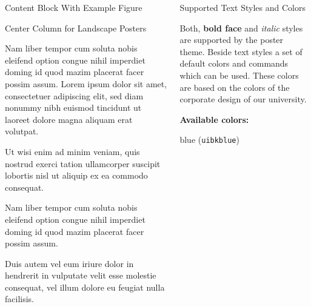 \documentclass[final]{beamer}
\begin{document}
\begin{frame}[fragile]
\begin{columns}[t]
\begin{centercolumn}
\begin{boxblock}{Content Block With Example Figure}
      \end{boxblock}

      \begin{boxblock}{Center Column for Landscape Posters}

         Nam liber tempor cum soluta nobis eleifend option congue nihil imperdiet doming
         id quod mazim placerat facer possim assum. Lorem ipsum dolor sit amet,
         consectetuer adipiscing elit, sed diam nonummy nibh euismod tincidunt ut
         laoreet dolore magna aliquam erat volutpat.

         \vspace{1em}
         Ut wisi enim ad minim veniam, quis
         nostrud exerci tation ullamcorper suscipit lobortis nisl ut aliquip ex ea
         commodo consequat.   
         
         \vspace{1em}
         Nam liber tempor cum soluta nobis eleifend option congue nihil imperdiet doming
         id quod mazim placerat facer possim assum.
         
         \vspace{1em}
         Duis autem vel eum iriure dolor in hendrerit in vulputate velit esse molestie
         consequat, vel illum dolore eu feugiat nulla facilisis. 

      \end{boxblock}

   \end{centercolumn} %
\fi


\begin{rightcolumn}

   \begin{boxblock}{Supported Text Styles and Colors}

      Both, \textbf{bold face} and \textit{italic} styles are supported
      by the poster theme. Beside text styles a set of default colors
      and commands which can be used. These colors are based on the colors of the
      corporate design of our university.

      \vspace{1em}
      \begin{minipage}[t]{.49\textwidth}
         {\bf Available colors:}

         \quad
            blue (\verb|uibkblue|)


\end{minipage}
\end{boxblock}
\end{rightcolumn}
\end{columns}
\end{frame}
\end{document}
